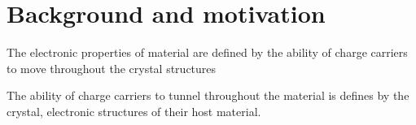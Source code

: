 \section{Background and motivation}

    The electronic properties of material are defined by the ability of charge carriers to move throughout the crystal structures

    
    The ability of charge carriers to tunnel throughout the material is defines by the crystal, electronic structures of their host material.


